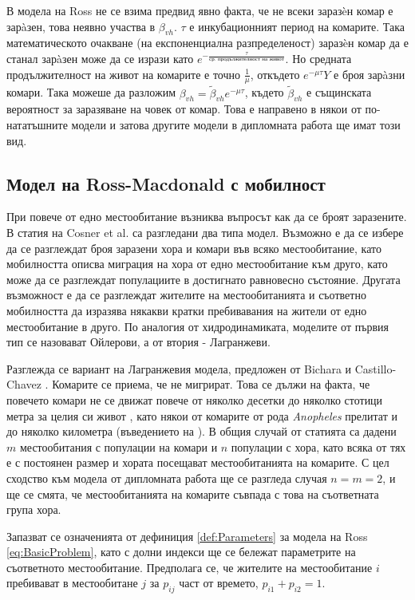 В модела на Ross не се взима предвид явно факта, че не всеки заразèн комар е зарàзен, това неявно участва в $\beta_{vh}$.
$\tau$ е инкубационният период на комарите. Така математическото очакване (на експоненциална разпределеност) заразèн комар да е станал зарàзен може да се изрази като $e^{-\frac{\tau}{\text{ср. продължителност на живот}}}$. Но средната продължителност на живот на комарите е точно $\frac{1}{\mu}$, откъдето $e^{-\mu\tau}Y$ е броя зарàзни комари.
Така можеше да разложим $\beta_{vh} = \tilde{\beta}_{vh} e^{-\mu\tau}$, където $\tilde{\beta}_{vh}$ е същинската вероятност за заразяване на човек от комар.
Това е направено в някои от по-нататъшните модели \cite{Smith2012} и затова другите модели в дипломната работа ще имат този вид.

\subsection{Модел на Ross-Macdonald с мобилност}
При повече от едно местообитание възниква въпросът как да се броят заразените. В статия на Cosner et al. \cite{Cosner2009} са разгледани два типа модел. Възможно е да се избере да се разглеждат броя заразени хора и комари във всяко местообитание, като мобилността описва миграция на хора от едно местообитание към друго, като може да се разглеждат популациите в достигнато равновесно състояние. Другата възможност е да се разглеждат жителите на местообитанията и съответно мобилността да изразява някакви кратки пребивавания на жители от едно местообитание в друго. По аналогия от хидродинамиката, моделите от първия тип се назовават Ойлерови, а от втория - Лагранжеви.

Разглежда се вариант на Лагранжевия модела, предложен от Bichara и Castillo-Chavez \cite{Bichara2016}.
Комарите се приема, че не мигрират.
Това се дължи на факта, че повечето комари не се движат повече от няколко десетки до няколко стотици метра за целия си живот \cite{Elbers2015}, като някои от комарите от рода \textit{Anopheles} прелитат и до няколко километра (въведението на \cite{Bichara2016}).
В общия случай от статията са дадени $m$ местообитания с популации на комари и $n$ популации с хора, като всяка от тях е с постоянен размер и хората посещават местообитанията на комарите.
С цел сходство към модела от дипломната работа ще се разгледа случая $n=m=2$, и ще се смята, че местообитанията на комарите съвпада с това на съответната група хора.

Запазват се означенията от дефиниция \ref{def:Parameters} за модела на Ross \eqref{eq:BasicProblem}, като с долни индекси ще се бележат параметрите на съответното местообитание.
Предполага се, че жителите на местообитание $i$ пребивават в местообитане $j$ за $p_{ij}$ част от времето, $p_{i1} + p_{i2} = 1$.

